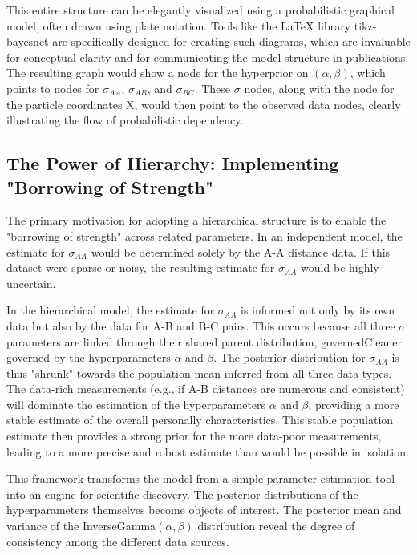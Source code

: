 \documentclass{article}
\begin{document}
This entire structure can be elegantly visualized using a probabilistic graphical model, often drawn using plate notation.\cite{ref7} Tools like the LaTeX library tikz-bayesnet are specifically designed for creating such diagrams, which are invaluable for conceptual clarity and for communicating the model structure in publications.\cite{ref15} The resulting graph would show a node for the hyperprior on $(\alpha, \beta)$, which points to nodes for $\sigma_{AA}$, $\sigma_{AB}$, and $\sigma_{BC}$. These $\sigma$ nodes, along with the node for the particle coordinates X, would then point to the observed data nodes, clearly illustrating the flow of probabilistic dependency.

\subsection{The Power of Hierarchy: Implementing "Borrowing of Strength"}

The primary motivation for adopting a hierarchical structure is to enable the "borrowing of strength" across related parameters.\cite{ref8} In an independent model, the estimate for $\sigma_{AA}$ would be determined solely by the A-A distance data. If this dataset were sparse or noisy, the resulting estimate for $\sigma_{AA}$ would be highly uncertain.

In the hierarchical model, the estimate for $\sigma_{AA}$ is informed not only by its own data but also by the data for A-B and B-C pairs. This occurs because all three $\sigma$ parameters are linked through their shared parent distribution, governedCleaner governed by the hyperparameters $\alpha$ and $\beta$. The posterior distribution for $\sigma_{AA}$ is thus "shrunk" towards the population mean inferred from all three data types. The data-rich measurements (e.g., if A-B distances are numerous and consistent) will dominate the estimation of the hyperparameters $\alpha$ and $\beta$, providing a more stable estimate of the overall personally characteristics. This stable population estimate then provides a strong prior for the more data-poor measurements, leading to a more precise and robust estimate than would be possible in isolation.\cite{ref7}

This framework transforms the model from a simple parameter estimation tool into an engine for scientific discovery. The posterior distributions of the hyperparameters themselves become objects of interest. The posterior mean and variance of the InverseGamma$(\alpha, \beta)$ distribution reveal the degree of consistency among the different data sources.
\end{document}
